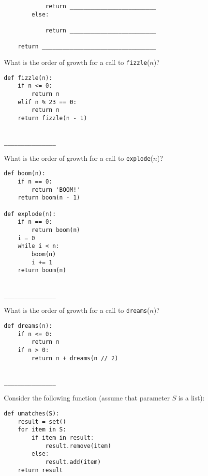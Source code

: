 \documentclass[twoside]{article}
\begin{document}
\begin{enumerate}
\begin{lstlisting}
            return _________________________
        else:
        
            return _________________________
            
    return _________________________________
\end{lstlisting}


\begin{enumerate}
What is the order of growth for a call to \texttt{fizzle}($n$)?

\begin{lstlisting}
def fizzle(n):
    if n <= 0:
        return n
    elif n % 23 == 0:
        return n
    return fizzle(n - 1)
\end{lstlisting}
~\\
\lstinline{_______________}

\newpage

What is the order of growth for a call to \texttt{explode}($n$)?

\begin{lstlisting}
def boom(n):
    if n == 0:
        return 'BOOM!'
    return boom(n - 1)

def explode(n):
    if n == 0:
        return boom(n)
    i = 0
    while i < n:
        boom(n)
        i += 1
    return boom(n)
\end{lstlisting}
~\\
\lstinline{_______________}

What is the order of growth for a call to \texttt{dreams}($n$)?

\begin{lstlisting}
def dreams(n):
    if n <= 0:
        return n
    if n > 0:
        return n + dreams(n // 2)
\end{lstlisting}
~\\
\lstinline{_______________}
\end{enumerate}


Consider the following function (assume that parameter $S$ is a list):

\begin{lstlisting}
def umatches(S):
    result = set()
    for item in S:
        if item in result:
            result.remove(item)
        else:
            result.add(item)
    return result
\end{lstlisting}


\end{enumerate}
\end{document}
